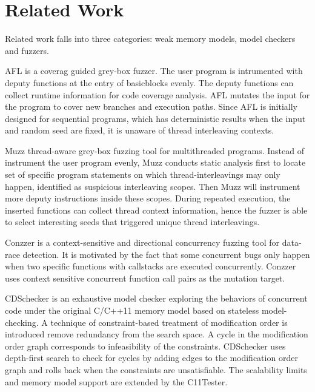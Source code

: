 \chapter{\label{cha:related}Related Work}

Related work falls into three categories: weak memory models, model checkers and fuzzers. 







AFL\cite{afl} is a coverag guided grey-box fuzzer. The user program is intrumented with deputy functions at the entry of basicblocks evenly. The deputy functions can collect runtime information for code coverage analysis. AFL mutates the input for the program to cover new branches and execution paths. Since AFL is initially designed for sequential programs, which has deterministic results when the input and random seed are fixed, it is unaware of thread interleaving contexts. 

Muzz\cite{muzz} thread-aware grey-box fuzzing tool for multithreaded programs. Instead of instrument the user program evenly, Muzz conducts static analysis first to locate set of specific program statements on which thread-interleavings may only happen, identified as suspicious interleaving scopes. Then Muzz will instrument more deputy instructions inside these scopes. During repeated execution, the inserted functions can collect thread context information, hence the fuzzer is able to select interesting seeds that triggered unique thread interleavings. 

Conzzer\cite{conzzer} is a context-sensitive and directional concurrency fuzzing tool for data-race detection. It is motivated by the fact that some concurrent bugs only happen when two specific functions with callstacks are executed concurrently. Conzzer uses context sensitive concurrent function call pairs as the mutation target. 



CDSchecker\cite{cdschecker} is an exhaustive model checker exploring the behaviors of concurrent code under the original C/C++11 memory model based on stateless model-checking. A technique of constraint-based treatment of modification order is introduced remove redundancy from the search space. A cycle in the modification order graph corresponds to infeasibility of the constraints. CDSchecker uses depth-first search to check for cycles by adding edges to the modification order graph and rolls back when the constraints are unsatisfiable. The scalability limits and memory model support are extended by the C11Tester. 

